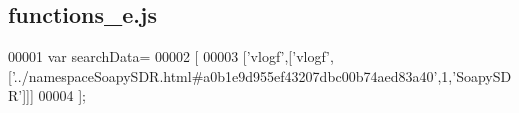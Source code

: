 \subsection{functions\+\_\+e.\+js}
\label{functions__e_8js_source}

\begin{DoxyCode}
00001 var searchData=
00002 [
00003   [\textcolor{stringliteral}{'vlogf'},[\textcolor{stringliteral}{'vlogf'},[\textcolor{stringliteral}{'../namespaceSoapySDR.html#a0b1e9d955ef43207dbc00b74aed83a40'},1,\textcolor{stringliteral}{'SoapySDR'}]]]
00004 ];
\end{DoxyCode}
